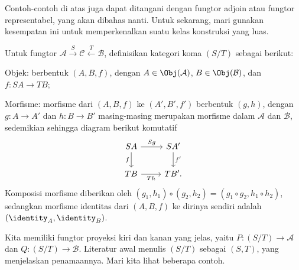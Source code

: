 Contoh-contoh di atas juga dapat ditangani dengan fungtor adjoin atau fungtor representabel, yang akan dibahas nanti. Untuk sekarang, mari gunakan kesempatan ini untuk memperkenalkan suatu kelas konstruksi yang luas.
\begin{definition}\label{def:comma-category}  
	Untuk fungtor $\mathcal{A} \xrightarrow{S} \mathcal{C} \xleftarrow{T} \mathcal{B}$, definisikan kategori koma $(S / T)$ sebagai berikut:
	\begin{compactitem}
		\item Objek: berbentuk $(A, B, f)$, dengan $A \in \Obj(\mathcal{A})$, $B \in \Obj(\mathcal{B})$, dan $f: SA \to TB$;
		\item Morfisme: morfisme dari $(A, B, f)$ ke $(A', B', f')$ berbentuk $(g,h)$, dengan $g: A \to A'$ dan $h: B \to B'$ masing-masing merupakan morfisme dalam $\mathcal{A}$ dan $\mathcal{B}$, sedemikian sehingga diagram berikut komutatif
		\[\begin{tikzcd}
			SA \arrow[r, "Sg"] \arrow[d, "f"'] & SA' \arrow[d, "f'"] \\
			TB \arrow[r, "Th"'] & TB' .
		\end{tikzcd}\]
		Komposisi morfisme diberikan oleh $(g_1, h_1) \circ (g_2, h_2) = (g_1 \circ g_2, h_1 \circ h_2)$, sedangkan morfisme identitas dari $(A,B,f)$ ke dirinya sendiri adalah $(\identity_A, \identity_B)$.
	\end{compactitem}
\end{definition}
Kita memiliki fungtor proyeksi kiri dan kanan yang jelas, yaitu $P: (S / T) \to \mathcal{A}$ dan $Q: (S / T) \to \mathcal{B}$. Literatur awal menulis $(S / T)$ sebagai $(S, T)$, yang menjelaskan penamaannya. Mari kita lihat beberapa contoh.


